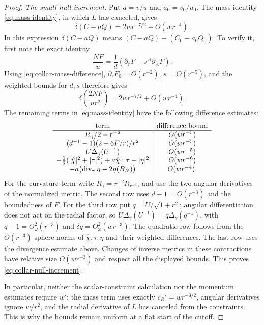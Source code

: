 \begin{proof}
\medskip
\noindent\emph{The small null increment.}
Put $a=v/u$ and $a_0=v_0/u_0$.  The mass identity
\eqref{eq:mass-identity}, in which $L$ has canceled, gives
\begin{equation}\label{eq:collar-null-increment}
 \delta(C-aQ)=2wr^{-7/2}+O(wr^{-4}).
\end{equation}
In this expression $\delta(C-aQ)$ means
$(C-aQ)-(C_0-a_0Q_0)$.  To verify it, first note the exact identity
\[
 \frac{NF}{u}=\frac1d(\partial_rF-s^A\partial_AF).
\]
Using \eqref{eq:collar-mass-difference}, $\partial_rF_0=O(r^{-2})$,
$s=O(r^{-5})$, and the weighted bounds for $d,s$ therefore gives
\begin{equation}\label{eq:collar-mass-derivative}
 \delta\left(\frac{2NF}{ur^2}\right)
   =2wr^{-7/2}+O(wr^{-4}).
\end{equation}
The remaining terms in \eqref{eq:mass-identity} have the following
difference estimates:
\[
\begin{array}{c|c}
 \text{term}&\text{difference bound}\\ \hline
 R_\gamma/2-r^{-2}&O(wr^{-5})\\
 (d^{-1}-1)(2-6F/r)/r^2&O(wr^{-5})\\
 U\Delta_\gamma(U^{-1})&O(wr^{-5})\\
 -\tfrac12(|\hat\chi|^2+|\tau|^2)+a\hat\chi:\tau-|\eta|^2
   &O(wr^{-6})\\
 -a\bigl(\operatorname{div}_\gamma\eta-2\eta(B_N)\bigr)&O(wr^{-4}).
\end{array}
\]
For the curvature term write
$R_\gamma=r^{-2}R_{r^{-2}\gamma}$ and use the two angular derivatives
of the normalized metric.  The second row uses $d-1=O(r^{-3})$ and
the boundedness of $F$.  For the third row put
$q=U/\sqrt{1+r^2}$; angular differentiation does not act on the radial
factor, so $U\Delta_\gamma(U^{-1})=q\Delta_\gamma(q^{-1})$, with
$q-1=O^2_\omega(r^{-3})$ and
$\delta q=O^2_\omega(wr^{-3})$.  The quadratic row follows from the
$O(r^{-3})$ sphere norms of $\hat\chi,\tau,\eta$ and their weighted
differences.  The last row uses the divergence estimate above.  Changes
of inverse metrics in these contractions have relative size
$O(wr^{-3})$ and respect all the displayed bounds.  This proves
\eqref{eq:collar-null-increment}.

In particular, neither the scalar-constraint calculation nor the
momentum estimates require $w'$: the mass term uses exactly
$c_R'=wr^{-3/2}$, angular derivatives ignore $w/r^2$, and the radial
derivative of $L$ has canceled from the constraints.  This is why the
bounds remain uniform at a flat start of the cutoff.


\end{proof}

